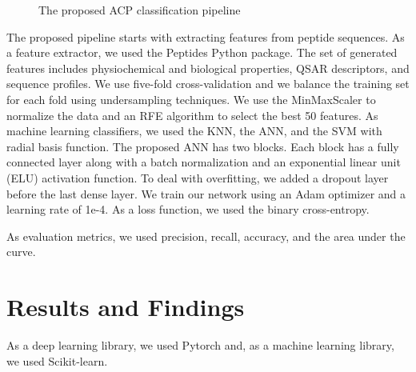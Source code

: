 \documentclass[twocolumn]{article}
\begin{document}
\begin{figure}[h!]
  \centering
{}
\caption{The proposed ACP classification pipeline}
\end{figure}


The proposed pipeline starts with extracting features from peptide sequences. As a feature extractor, we used the Peptides Python package. The set of generated features includes physiochemical and biological properties, QSAR descriptors, and sequence profiles. We use five-fold cross-validation and we balance the training set for each fold using undersampling techniques. We use the MinMaxScaler to normalize the data and an RFE algorithm to select the best 50 features. As machine learning classifiers, we used the KNN, the ANN, and the SVM with radial basis function. The proposed ANN has two blocks. Each block has a fully connected layer along with a batch normalization and an exponential linear unit (ELU) activation function. To deal with overfitting, we added a dropout layer before the last dense layer. We train our network using an Adam optimizer and a learning rate of 1e-4. As a loss function, we used the binary cross-entropy.

As evaluation metrics, we used precision, recall, accuracy, and the area under the curve.
\section{Results and Findings}
As a deep learning library, we used Pytorch and, as a machine learning library, we used Scikit-learn.
\end{document}
